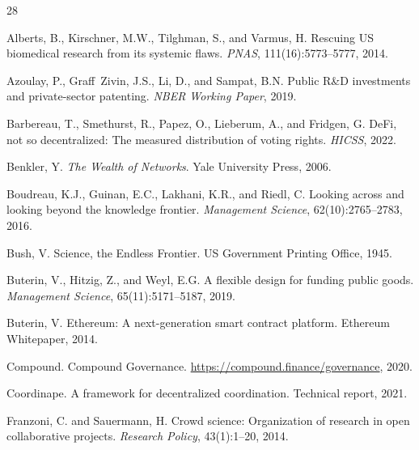 \documentclass[11pt,a4paper]{article}
\begin{document}
\begin{thebibliography}{28}

Alberts, B., Kirschner, M.W., Tilghman, S., and Varmus, H.
\newblock Rescuing US biomedical research from its systemic flaws.
\newblock \emph{PNAS}, 111(16):5773--5777, 2014.

Azoulay, P., Graff~Zivin, J.S., Li, D., and Sampat, B.N.
\newblock Public R\&D investments and private-sector patenting.
\newblock \emph{NBER Working Paper}, 2019.

Barbereau, T., Smethurst, R., Papez, O., Lieberum, A., and Fridgen, G.
\newblock DeFi, not so decentralized: The measured distribution of voting rights.
\newblock \emph{HICSS}, 2022.

Benkler, Y.
\newblock \emph{The Wealth of Networks}.
\newblock Yale University Press, 2006.

Boudreau, K.J., Guinan, E.C., Lakhani, K.R., and Riedl, C.
\newblock Looking across and looking beyond the knowledge frontier.
\newblock \emph{Management Science}, 62(10):2765--2783, 2016.

Bush, V.
\newblock Science, the Endless Frontier.
\newblock US Government Printing Office, 1945.

Buterin, V., Hitzig, Z., and Weyl, E.G.
\newblock A flexible design for funding public goods.
\newblock \emph{Management Science}, 65(11):5171--5187, 2019.

Buterin, V.
\newblock Ethereum: A next-generation smart contract platform.
\newblock Ethereum Whitepaper, 2014.

Compound.
\newblock Compound Governance.
\newblock \url{https://compound.finance/governance}, 2020.

Coordinape.
\newblock A framework for decentralized coordination.
\newblock Technical report, 2021.

Franzoni, C. and Sauermann, H.
\newblock Crowd science: Organization of research in open collaborative projects.
\newblock \emph{Research Policy}, 43(1):1--20, 2014.


\end{thebibliography}
\end{document}
